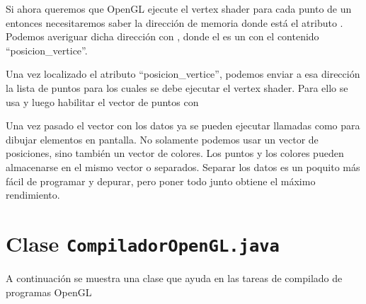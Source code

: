 \documentclass[a4paper,12pt,spanish]{sphinxmanual}
\begin{document}
Si ahora queremos que OpenGL ejecute el vertex shader para cada punto de un  entonces necesitaremos saber la dirección de memoria donde está el atributo . Podemos averiguar dicha dirección con , donde el  es un  con el contenido ``posicion\_vertice''.

Una vez localizado el atributo ``posicion\_vertice'', podemos enviar a esa dirección la lista de puntos para los cuales se debe ejecutar el vertex shader. Para ello se usa  y luego habilitar el vector de puntos con 

Una vez pasado el vector con los datos ya se pueden ejecutar llamadas como  para dibujar elementos en pantalla. No solamente podemos usar un vector de posiciones, sino también un vector de colores. Los puntos y los colores pueden almacenarse en el mismo vector o separados. Separar los datos es un poquito más fácil de programar y depurar, pero poner todo junto obtiene el máximo rendimiento.


\section{Clase \texttt{CompiladorOpenGL.java}}
\label{cap6resumen:clase-compiladoropengl-java}
A continuación se muestra una clase que ayuda en las tareas de compilado de programas OpenGL
\end{document}
